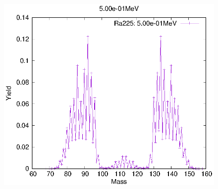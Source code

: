 \begin{figure}[htbp]
\begin{minipage}{0.33\textwidth} \begin{center} \includegraphics[width=\textwidth]{YA/Ra225_5.00e-01.eps} \end{center} \end{minipage}
\end{figure}
